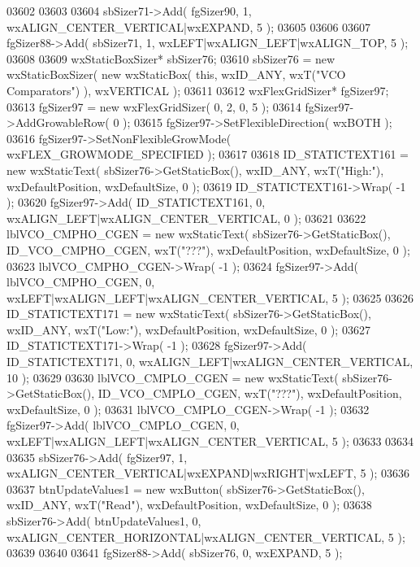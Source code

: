 \begin{DoxyCode}
03602     
03603     
03604     sbSizer71->Add( fgSizer90, 1, wxALIGN\_CENTER\_VERTICAL|wxEXPAND, 5 );
03605     
03606     
03607     fgSizer88->Add( sbSizer71, 1, wxLEFT|wxALIGN\_LEFT|wxALIGN\_TOP, 5 );
03608     
03609     wxStaticBoxSizer* sbSizer76;
03610     sbSizer76 = \textcolor{keyword}{new} wxStaticBoxSizer( \textcolor{keyword}{new} wxStaticBox( \textcolor{keyword}{this}, wxID\_ANY, wxT(\textcolor{stringliteral}{"VCO Comparators"}) ), wxVERTICAL
       );
03611     
03612     wxFlexGridSizer* fgSizer97;
03613     fgSizer97 = \textcolor{keyword}{new} wxFlexGridSizer( 0, 2, 0, 5 );
03614     fgSizer97->AddGrowableRow( 0 );
03615     fgSizer97->SetFlexibleDirection( wxBOTH );
03616     fgSizer97->SetNonFlexibleGrowMode( wxFLEX\_GROWMODE\_SPECIFIED );
03617     
03618     ID_STATICTEXT161 = \textcolor{keyword}{new} wxStaticText( sbSizer76->GetStaticBox(), wxID\_ANY, wxT(\textcolor{stringliteral}{"High:"}), 
      wxDefaultPosition, wxDefaultSize, 0 );
03619     ID_STATICTEXT161->Wrap( -1 );
03620     fgSizer97->Add( ID_STATICTEXT161, 0, wxALIGN\_LEFT|wxALIGN\_CENTER\_VERTICAL, 0 );
03621     
03622     lblVCO_CMPHO_CGEN = \textcolor{keyword}{new} wxStaticText( sbSizer76->GetStaticBox(), 
      ID_VCO_CMPHO_CGEN, wxT(\textcolor{stringliteral}{"???"}), wxDefaultPosition, wxDefaultSize, 0 );
03623     lblVCO_CMPHO_CGEN->Wrap( -1 );
03624     fgSizer97->Add( lblVCO_CMPHO_CGEN, 0, wxLEFT|wxALIGN\_LEFT|wxALIGN\_CENTER\_VERTICAL, 5 );
03625     
03626     ID_STATICTEXT171 = \textcolor{keyword}{new} wxStaticText( sbSizer76->GetStaticBox(), wxID\_ANY, wxT(\textcolor{stringliteral}{"Low:"}), 
      wxDefaultPosition, wxDefaultSize, 0 );
03627     ID_STATICTEXT171->Wrap( -1 );
03628     fgSizer97->Add( ID_STATICTEXT171, 0, wxALIGN\_LEFT|wxALIGN\_CENTER\_VERTICAL, 10 );
03629     
03630     lblVCO_CMPLO_CGEN = \textcolor{keyword}{new} wxStaticText( sbSizer76->GetStaticBox(), 
      ID_VCO_CMPLO_CGEN, wxT(\textcolor{stringliteral}{"???"}), wxDefaultPosition, wxDefaultSize, 0 );
03631     lblVCO_CMPLO_CGEN->Wrap( -1 );
03632     fgSizer97->Add( lblVCO_CMPLO_CGEN, 0, wxLEFT|wxALIGN\_LEFT|wxALIGN\_CENTER\_VERTICAL, 5 );
03633     
03634     
03635     sbSizer76->Add( fgSizer97, 1, wxALIGN\_CENTER\_VERTICAL|wxEXPAND|wxRIGHT|wxLEFT, 5 );
03636     
03637     btnUpdateValues1 = \textcolor{keyword}{new} wxButton( sbSizer76->GetStaticBox(), wxID\_ANY, wxT(\textcolor{stringliteral}{"Read"}), wxDefaultPosition, 
      wxDefaultSize, 0 );
03638     sbSizer76->Add( btnUpdateValues1, 0, wxALIGN\_CENTER\_HORIZONTAL|wxALIGN\_CENTER\_VERTICAL, 5 );
03639     
03640     
03641     fgSizer88->Add( sbSizer76, 0, wxEXPAND, 5 );

\end{DoxyCode}
